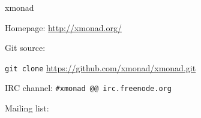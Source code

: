 \begin{hcarentry}{xmonad}
\FurtherReading
\begin{compactitem}
\item Homepage:
 \url{http://xmonad.org/}

\item Git source:

 \texttt{git clone} \url{https://github.com/xmonad/xmonad.git}

\item IRC channel:
 \verb+#xmonad @@ irc.freenode.org+

\item Mailing list:
\end{compactitem}
\end{hcarentry}
